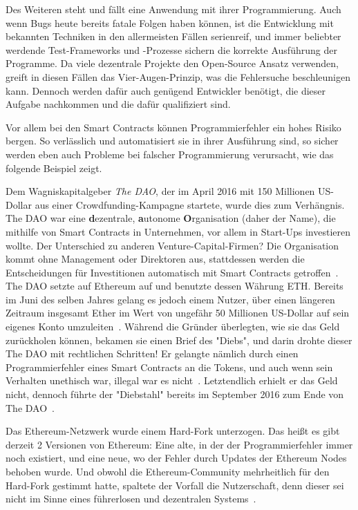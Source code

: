 Des Weiteren steht und fällt eine Anwendung mit ihrer Programmierung. Auch wenn Bugs heute bereits fatale Folgen haben können, ist die Entwicklung mit bekannten Techniken in den allermeisten Fällen serienreif, und immer beliebter werdende Test-Frameworks und -Prozesse sichern die korrekte Ausführung der Programme. Da viele dezentrale Projekte den Open-Source Ansatz verwenden, greift in diesen Fällen das Vier-Augen-Prinzip, was die Fehlersuche beschleunigen kann. Dennoch werden dafür auch genügend Entwickler benötigt, die dieser Aufgabe nachkommen und die dafür qualifiziert sind. 

Vor allem bei den Smart Contracts können Programmierfehler ein hohes Risiko bergen. So verlässlich und automatisiert sie in ihrer Ausführung sind, so sicher werden eben auch Probleme bei falscher Programmierung verursacht, wie das folgende Beispiel zeigt.

\smallskip

Dem Wagniskapitalgeber \textit{The DAO}, der im April 2016 mit 150 Millionen US-Dollar aus einer Crowdfunding-Kampagne startete, wurde dies zum Verhängnis. The DAO war eine \textbf{d}ezentrale, \textbf{a}utonome \textbf{O}rganisation (daher der Name), die mithilfe von Smart Contracts in Unternehmen, vor allem in Start-Ups investieren wollte. Der Unterschied zu anderen Venture-Capital-Firmen? Die Organisation kommt ohne Management oder Direktoren aus, stattdessen werden die Entscheidungen für Investitionen automatisch mit Smart Contracts getroffen~\cite{Reiff.2019}.
The DAO setzte auf Ethereum auf und benutzte dessen Währung ETH. Bereits im Juni des selben Jahres gelang es jedoch einem Nutzer, über einen längeren Zeitraum insgesamt Ether im Wert von ungefähr 50 Millionen US-Dollar auf sein eigenes Konto umzuleiten~\cite{Reiff.2019}. Während die Gründer überlegten, wie sie das Geld zurückholen können, bekamen sie einen Brief des "Diebs", und darin drohte dieser The DAO mit rechtlichen Schritten! Er gelangte nämlich durch einen Programmierfehler eines Smart Contracts an die Tokens, und auch wenn sein Verhalten unethisch war, illegal war es nicht~\cite[05:08]{Krypto.2018}. Letztendlich erhielt er das Geld nicht, dennoch führte der "Diebstahl" bereits im September 2016 zum Ende von The DAO~\cite{Reiff.2019}. 

Das Ethereum-Netzwerk wurde einem Hard-Fork unterzogen. Das heißt es gibt derzeit 2 Versionen von Ethereum: Eine alte, in der der Programmierfehler immer noch existiert, und eine neue, wo der Fehler durch Updates der Ethereum Nodes behoben wurde. Und obwohl die Ethereum-Community mehrheitlich für den Hard-Fork gestimmt hatte, spaltete der Vorfall die Nutzerschaft, denn dieser sei nicht im Sinne eines führerlosen und dezentralen Systems~\cite{Hayes.2016}. 





